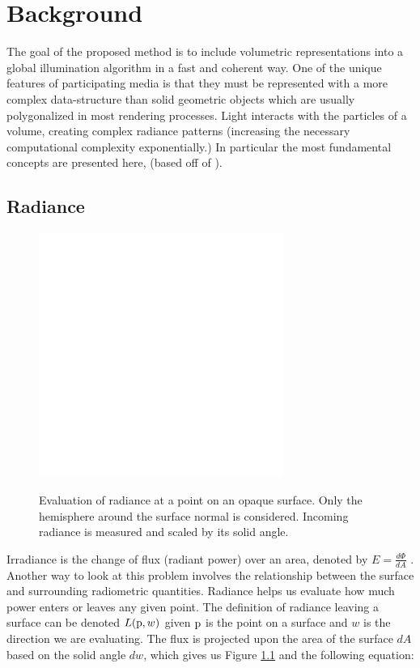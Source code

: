 \documentclass[12pt]{ucthesis}
\newcommand{\captionfonts}{\small\bf\ssp}
\begin{document}
\chapter{Background}
\label{background}

The goal of the proposed method is to include volumetric representations into a global illumination algorithm in a fast and coherent way. One of the unique features of participating media is that they must be represented with a more complex data-structure than solid geometric objects which are usually polygonalized in most rendering processes.  Light interacts with the particles of a volume, creating complex radiance patterns (increasing the necessary computational complexity exponentially.) In particular the most fundamental concepts are presented here,  (based off of  \cite{pbrt}).

\section{Radiance}

\begin{figure}[h!]
    \centering
    \includegraphics[width=80mm]{img/diag/radiance.pdf}
    \captionfonts
    \caption{Evaluation of radiance at a point on an opaque surface.  Only the hemisphere around the surface normal is considered.  Incoming radiance is measured and scaled by its solid angle.}
    \label{fig:radiance}
\end{figure}

Irradiance is the change of flux (radiant power) over an area, denoted by $E = \frac{d\Phi}{dA}$ \cite{aga}. Another way to look at this problem involves the relationship between the surface and surrounding radiometric quantities.  Radiance helps us evaluate how much power enters or leaves any given point.  The definition of radiance leaving a surface can be denoted $L(\textup{p}, w)$ given $\textup{p}$ is the point on a surface and $w$ is the direction we are evaluating.  The flux is projected upon the area of the surface $dA$ based on the solid angle $dw$, which gives us Figure \ref{fig:radiance} and the following equation:
\end{document}
